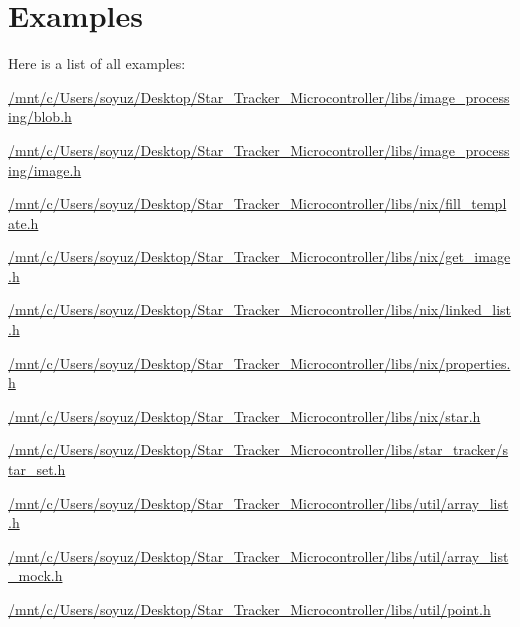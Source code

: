 \section{Examples}
Here is a list of all examples\+:\begin{DoxyCompactItemize}
\item 
\hyperlink{_2mnt_2c_2Users_2soyuz_2Desktop_2Star_Tracker_Microcontroller_2libs_2image_processing_2blob_8h-example}{/mnt/c/\+Users/soyuz/\+Desktop/\+Star\+\_\+\+Tracker\+\_\+\+Microcontroller/libs/image\+\_\+processing/blob.\+h}
\item 
\hyperlink{_2mnt_2c_2Users_2soyuz_2Desktop_2Star_Tracker_Microcontroller_2libs_2image_processing_2image_8h-example}{/mnt/c/\+Users/soyuz/\+Desktop/\+Star\+\_\+\+Tracker\+\_\+\+Microcontroller/libs/image\+\_\+processing/image.\+h}
\item 
\hyperlink{_2mnt_2c_2Users_2soyuz_2Desktop_2Star_Tracker_Microcontroller_2libs_2nix_2fill_template_8h-example}{/mnt/c/\+Users/soyuz/\+Desktop/\+Star\+\_\+\+Tracker\+\_\+\+Microcontroller/libs/nix/fill\+\_\+template.\+h}
\item 
\hyperlink{_2mnt_2c_2Users_2soyuz_2Desktop_2Star_Tracker_Microcontroller_2libs_2nix_2get_image_8h-example}{/mnt/c/\+Users/soyuz/\+Desktop/\+Star\+\_\+\+Tracker\+\_\+\+Microcontroller/libs/nix/get\+\_\+image.\+h}
\item 
\hyperlink{_2mnt_2c_2Users_2soyuz_2Desktop_2Star_Tracker_Microcontroller_2libs_2nix_2linked_list_8h-example}{/mnt/c/\+Users/soyuz/\+Desktop/\+Star\+\_\+\+Tracker\+\_\+\+Microcontroller/libs/nix/linked\+\_\+list.\+h}
\item 
\hyperlink{_2mnt_2c_2Users_2soyuz_2Desktop_2Star_Tracker_Microcontroller_2libs_2nix_2properties_8h-example}{/mnt/c/\+Users/soyuz/\+Desktop/\+Star\+\_\+\+Tracker\+\_\+\+Microcontroller/libs/nix/properties.\+h}
\item 
\hyperlink{_2mnt_2c_2Users_2soyuz_2Desktop_2Star_Tracker_Microcontroller_2libs_2nix_2star_8h-example}{/mnt/c/\+Users/soyuz/\+Desktop/\+Star\+\_\+\+Tracker\+\_\+\+Microcontroller/libs/nix/star.\+h}
\item 
\hyperlink{_2mnt_2c_2Users_2soyuz_2Desktop_2Star_Tracker_Microcontroller_2libs_2star_tracker_2star_set_8h-example}{/mnt/c/\+Users/soyuz/\+Desktop/\+Star\+\_\+\+Tracker\+\_\+\+Microcontroller/libs/star\+\_\+tracker/star\+\_\+set.\+h}
\item 
\hyperlink{_2mnt_2c_2Users_2soyuz_2Desktop_2Star_Tracker_Microcontroller_2libs_2util_2array_list_8h-example}{/mnt/c/\+Users/soyuz/\+Desktop/\+Star\+\_\+\+Tracker\+\_\+\+Microcontroller/libs/util/array\+\_\+list.\+h}
\item 
\hyperlink{_2mnt_2c_2Users_2soyuz_2Desktop_2Star_Tracker_Microcontroller_2libs_2util_2array_list_mock_8h-example}{/mnt/c/\+Users/soyuz/\+Desktop/\+Star\+\_\+\+Tracker\+\_\+\+Microcontroller/libs/util/array\+\_\+list\+\_\+mock.\+h}
\item 
\hyperlink{_2mnt_2c_2Users_2soyuz_2Desktop_2Star_Tracker_Microcontroller_2libs_2util_2point_8h-example}{/mnt/c/\+Users/soyuz/\+Desktop/\+Star\+\_\+\+Tracker\+\_\+\+Microcontroller/libs/util/point.\+h}
\end{DoxyCompactItemize}
